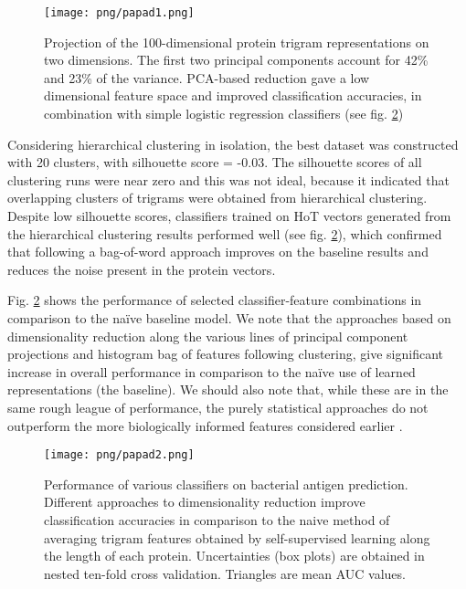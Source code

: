 \documentclass[10pt,journal,compsoc,twoside]{IEEEtran}
\begin{document}
\begin{figure}[!t]
\centering
\texttt{[image: png/papad1.png]}
\caption{Projection of the 100-dimensional protein trigram representations on two dimensions. The first two principal components account for 42\% and 23\% of the variance. PCA-based reduction gave a low dimensional feature space and improved classification accuracies, in combination with simple logistic regression classifiers (see fig. \ref{fig:fig-model-selection})}
\label{fig:fig-pca}
\end{figure}

Considering hierarchical clustering in isolation, the best dataset was constructed with 20 clusters, with silhouette score = -0.03. The silhouette scores of all clustering runs were near zero and this was not ideal, because it indicated that overlapping clusters of trigrams were obtained from hierarchical clustering. Despite low silhouette scores, classifiers trained on HoT vectors generated from the hierarchical clustering results performed well (see fig. \ref{fig:fig-model-selection}), which confirmed that following a bag-of-word approach improves on the baseline results and reduces the noise present in the protein vectors.

Fig. \ref{fig:fig-model-selection} shows the performance of selected classifier-feature combinations in comparison to the naïve baseline model. We note that the approaches based on dimensionality reduction along the various lines of principal component projections and histogram bag of features following clustering, give significant increase in overall performance in comparison to the naïve use of learned representations (the baseline). We should also note that, while these are in the same rough league of performance, the purely statistical approaches do not outperform the more biologically informed features considered earlier \cite{heinson_2019}.

\begin{figure}[!t]
\centering
\texttt{[image: png/papad2.png]}
\caption{Performance of various classifiers on bacterial antigen prediction. Different approaches to dimensionality reduction improve classification accuracies in comparison to the naive method of averaging trigram features obtained by self-supervised learning along the length of each protein. Uncertainties (box plots) are obtained in nested ten-fold cross validation. Triangles are mean AUC values.}
\label{fig:fig-model-selection}
\end{figure}
\end{document}
